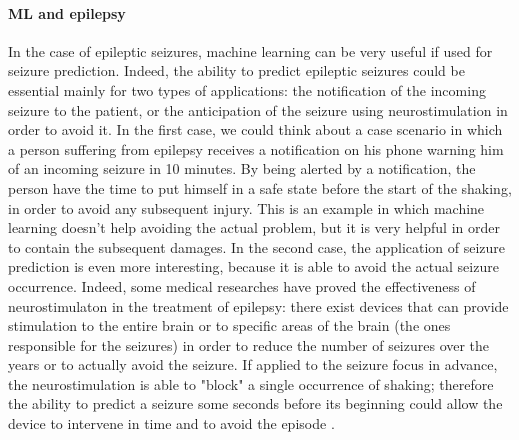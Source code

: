 \paragraph{ML and epilepsy} In the case of epileptic seizures, machine learning can be very useful if used for seizure prediction. Indeed, the ability to predict epileptic seizures could be essential mainly for two types of applications: the notification of the incoming seizure to the patient, or the anticipation of the seizure using neurostimulation in order to avoid it. In the first case, we could think about a case scenario in which a person suffering from epilepsy receives a notification on his phone warning him of an incoming seizure in 10 minutes. By being alerted by a notification, the person have the time to put himself in a safe state before the start of the shaking, in order to avoid any subsequent injury. This is an example in which machine learning doesn't help avoiding the actual problem, but it is very helpful in order to contain the subsequent damages. In the second case, the application of seizure prediction is even more interesting, because it is able to avoid the actual seizure occurrence. Indeed, some medical researches \cite{NCBI:Neurostimulation} have proved the effectiveness of neurostimulaton in the treatment of epilepsy: there exist devices that can provide stimulation to the entire brain or to specific areas of the brain (the ones responsible for the seizures) in order to reduce the number of seizures over the years or to actually avoid the seizure. If applied to the seizure focus in advance, the neurostimulation is able to "block" a single occurrence of shaking; therefore the ability to predict a seizure some seconds before its beginning could allow the device to intervene in time and to avoid the episode \cite{EF:Neurostimulation}.

